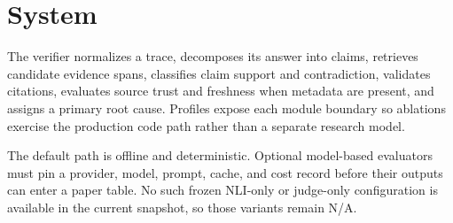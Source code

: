 \section{System}
The verifier normalizes a trace, decomposes its answer into claims, retrieves
candidate evidence spans, classifies claim support and contradiction, validates
citations, evaluates source trust and freshness when metadata are present, and
assigns a primary root cause. Profiles expose each module boundary so ablations
exercise the production code path rather than a separate research model.

The default path is offline and deterministic. Optional model-based evaluators
must pin a provider, model, prompt, cache, and cost record before their outputs
can enter a paper table. No such frozen NLI-only or judge-only configuration is
available in the current snapshot, so those variants remain N/A.
